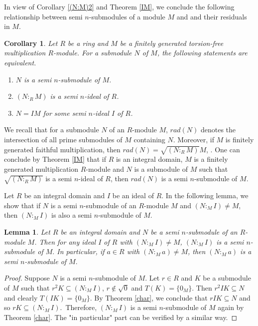 \documentclass{amsart}%
\theoremstyle{plain}
\newtheorem{corollary}{Corollary}
\newtheorem{lemma}{Lemma}
\numberwithin{equation}{section}
\begin{document}
In view of Corollary \ref{(N:M)2} and Theorem \ref{IM}, we conclude the
following relationship between semi $n$-submodules of a module $M$ and and
their residuals in $M$.

\begin{corollary}
\label{(N:M)}Let $R$ be a ring and $M$ be a finitely generated torsion-free
multiplication $R$-module. For a submodule $N$ of $M$, the following
statements are equivalent.

\begin{enumerate}
\item $N$ is a semi $n$-submodule of $M$.

\item $(N:_{R}M)$ is a semi $n$-ideal of $R$.

\item $N=IM$ for some semi $n$-ideal $I$ of $R$.
\end{enumerate}
\end{corollary}

We recall that for a submodule $N$ of an $R$-module $M$, $rad(N)$ denotes the
intersection of all prime submodules of $M$ containing $N$. Moreover, if $M$
is finitely generated faithful multiplication, then $rad(N)=\sqrt{(N:_{R}M)}%
M$, \cite{Smith}. One can conclude by Theorem \ref{IM} that if $R$ is an
integral domain, $M$ is a finitely generated multiplication $R$-module and $N$
is a submodule of $M$ such that $\sqrt{(N:_{R}M)}$ is a semi $n$-ideal of $R$,
then $rad(N)$ is a semi $n$-submodule of $M.$

Let $R$ be an integral domain and $I$ be an ideal of $R$. In the following
lemma, we show that if $N$ is a semi $n$-submodule of an $R$-module $M$ and
$(N:_{M}I)\neq M$, then $(N:_{M}I)$ is also a semi $n$-submodule of $M.$

\begin{lemma}
\label{(N:I)}Let $R$ be an integral domain and $N$ be a semi $n$-submodule of
an $R$-module $M$. Then for any ideal $I$ of $R$ with $(N:_{M}I)\neq M$,
$(N:_{M}I)$ is a semi $n$-submodule of $M.$ In particular, if $a\in R$ with
$(N:_{M}a)\neq M$, then $(N:_{M}a)$ is a semi $n$-submodule of $M.$
\end{lemma}

\begin{proof}
Suppose $N$ is a semi $n$-submodule of $M$. Let $r\in R$ and $K$ be a
submodule of $M$ such that $r^{2}K\subseteq(N:_{M}I)$, $r\notin\sqrt{0}$ and
$T(K)=\{0_{M}\}$. Then $r^{2}IK\subseteq N$ and clearly $T(IK)=\{0_{M}\}$. By
Theorem \ref{char}, we conclude that $rIK\subseteq N$ and so $rK\subseteq
(N:_{M}I)$.\ Therefore, $(N:_{M}I)$ is a semi $n$-submodule of $M$ again by
Theorem \ref{char}. The "in particular" part can be verified by a similar way.
\end{proof}
\end{document}

